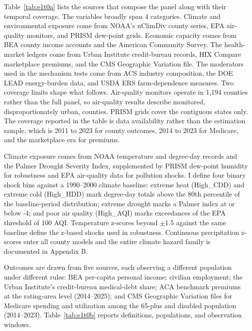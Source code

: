 \documentclass[a4paper,11pt]{report}
\begin{document}
Table~\ref{tab:e1t0a} lists the sources that compose the panel along with their temporal coverage. The variables broadly span 4 categories. Climate and environmental exposure come from NOAA's nClimDiv county series, EPA air-quality monitors, and PRISM dew-point grids. Economic capacity comes from BEA county income accounts and the American Community Survey. The health-market ledgers come from Urban Institute credit-bureau records, HIX Compare marketplace premiums, and the CMS Geographic Variation file. The moderators used in the mechanism tests come from ACS industry composition, the DOE LEAD energy-burden data, and USDA ERS farm-dependence measures. Two coverage limits shape what follows. Air-quality monitors operate in 1,194 counties rather than the full panel, so air-quality results describe monitored, disproportionately urban, counties. PRISM grids cover the contiguous states only. The coverage reported in the table is data availability rather than the estimation sample, which is 2011 to 2023 for county outcomes, 2014 to 2023 for Medicare, and the marketplace era for premiums.



Climate exposure comes from NOAA temperature and degree-day records and the Palmer Drought Severity Index, supplemented by PRISM dew-point humidity for robustness and EPA air-quality data for pollution shocks. I define four binary shock bins against a 1990--2000 climate baseline: extreme heat (High\_CDD) and extreme cold (High\_HDD) mark degree-day totals above the 80th percentile of the baseline-period distribution; extreme drought marks a Palmer index at or below -4; and poor air quality (High\_AQI) marks exceedances of the EPA threshold of 100 AQI. Temperature z-scores beyond $\pm$1.5 against the same baseline define the z-based shocks used in robustness. Continuous precipitation z-scores enter all county models and the entire climate hazard family is documented in Appendix B.

Outcomes are drawn from five sources, each observing a different population under different rules: BEA per-capita personal income; civilian employment; the Urban Institute's credit-bureau medical-debt share; ACA benchmark premiums at the rating-area level (2014--2025); and CMS Geographic Variation files for Medicare spending and utilization among the 65-plus and disabled population (2014--2023). Table~\ref{tab:e1t0b} reports definitions, populations, and observation windows.


\end{document}
